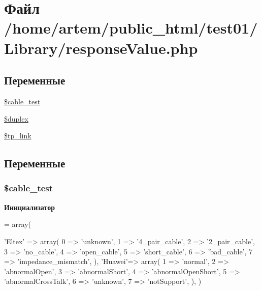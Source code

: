 \hypertarget{response_value_8php}{\section{Файл /home/artem/public\-\_\-html/test01/\-Library/response\-Value.php}
\label{response_value_8php}
}
\subsection*{Переменные}
\begin{DoxyCompactItemize}
\item 
\hyperlink{response_value_8php_ae0752d506f59c02cbd022de5ee0a371c}{\$cable\-\_\-test}
\item 
\hyperlink{response_value_8php_a56a6c878ef4d3c87cd7e23a5a8a711bf}{\$duplex}
\item 
\hyperlink{response_value_8php_aad99044bfc955d333452214ca7eeba97}{\$tp\-\_\-link}
\end{DoxyCompactItemize}


\subsection{Переменные}
\hypertarget{response_value_8php_ae0752d506f59c02cbd022de5ee0a371c}{
\subsubsection[{\$cable\-\_\-test}]{\setlength{\rightskip}{0pt plus 5cm}\$cable\-\_\-test}}\label{response_value_8php_ae0752d506f59c02cbd022de5ee0a371c}
{\bfseries Инициализатор}
\begin{DoxyCode}
= array(

    \textcolor{stringliteral}{'Eltex'} => array(
        0 => \textcolor{stringliteral}{'unknown'},
        1 => \textcolor{stringliteral}{'4\_pair\_cable'},
        2 => \textcolor{stringliteral}{'2\_pair\_cable'},
        3 => \textcolor{stringliteral}{'no\_cable'},
        4 => \textcolor{stringliteral}{'open\_cable'},
        5 => \textcolor{stringliteral}{'short\_cable'},
        6 => \textcolor{stringliteral}{'bad\_cable'},
        7 => \textcolor{stringliteral}{'impedance\_mismatch'},
    ),
    \textcolor{stringliteral}{'Huawei'}=> array(
        1 => \textcolor{stringliteral}{'normal'},
        2 => \textcolor{stringliteral}{'abnormalOpen'},
        3 => \textcolor{stringliteral}{'abnormalShort'},
        4 => \textcolor{stringliteral}{'abnormalOpenShort'},
        5 => \textcolor{stringliteral}{'abnormalCrossTalk'},
        6 => \textcolor{stringliteral}{'unknown'},
        7 => \textcolor{stringliteral}{'notSupport'},
    ),
)
\end{DoxyCode}


